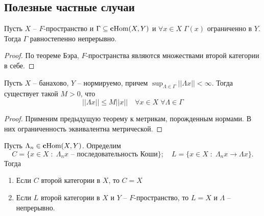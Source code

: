 \documentclass[12pt, a4paper, oneside]{book}
\begin{document}
\subsection{Полезные частные случаи}
\begin{theorem}
    Пусть $X$ -- $F$-пространство и $\Gamma \subseteq \text{\textbf{c}Hom}(X,Y)$ и $\forall x \in X \; \Gamma(x)$ ограниченно в $Y$.
    Тогда $\Gamma$ равностепенно непрерывно.
\end{theorem}
\begin{proof}
По теореме Бэра, $F$-пространства являются множествами второй категории в себе.
\end{proof}
\begin{theorem}
    Пусть $X$ -- банахово, $Y$ -- нормируемо, причем $\sup_{\Lambda \in \Gamma} ||\Lambda x || < \infty$. Тогда существует такой $M > 0$, что
    $$||\Lambda x|| \leqslant M ||x||\quad \forall x \in X \; \forall \Lambda \in \Gamma$$
\end{theorem}
\begin{proof}
Применим предыдущую теорему к метрикам, порожденным нормами. В них ограниченность эквивалентна метрической.
\end{proof}
\begin{theorem}
    Пусть $\Lambda_n \in \text{\textbf{c}Hom}(X,Y)$. Определим $$ C = \{x \in X\; : \; \Lambda_n x \text{ -- последовательность Коши}   \}; \quad  L = \{x \in X \; : \; \Lambda_n x \to \Lambda x \}.$$
    Тогда
    \begin{enumerate}
        \item Если $C$ второй категории в $X$, то $C = X$
        \item Если $L$ второй категории в $X$ и $Y$ -- $F$-пространство, то $L = X$ и $\Lambda$ -- непрерывно.
    \end{enumerate}
\end{theorem}
\end{document}
